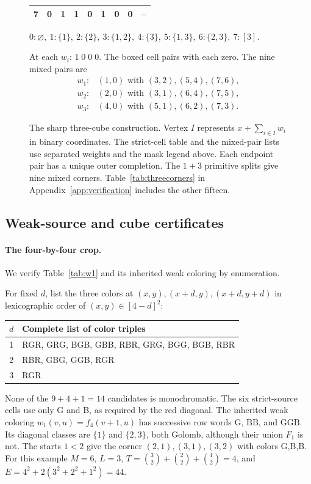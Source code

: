 \documentclass[11pt,a4paper]{article}
\theoremstyle{definition}
\numberwithin{equation}{section}
\begin{document}
\begin{figure}[htbp]
\begin{minipage}[c]{.51\textwidth}
\begin{tabular}{@{}r*{8}{r}@{}}
				7&0&1&1&0&1&0&0&--\\\bottomrule
			\end{tabular}
		\end{minipage}
		\par\medskip
		$0:\varnothing,\ 1:\{1\},\ 2:\{2\},\ 3:\{1,2\},\ 4:\{3\},\ 5:\{1,3\},\ 6:\{2,3\},\ 7:[3].$
		\par\smallskip
		At each $w_i$: $\boxed{1}\;0\;0\;0$. The boxed cell pairs with each zero. The nine mixed pairs are
		\[
		\begin{array}{ll}
			w_1:&(1,0)\text{ with }(3,2),(5,4),(7,6),\\
			w_2:&(2,0)\text{ with }(3,1),(6,4),(7,5),\\
			w_3:&(4,0)\text{ with }(5,1),(6,2),(7,3).
		\end{array}
		\]
		\caption{The sharp three-cube construction. Vertex $I$ represents $x+\sum_{i\in I}w_i$ in binary coordinates. The strict-cell table and the mixed-pair lists use separated weights and the mask legend above. Each endpoint pair has a unique outer completion. The $1+3$ primitive splits give nine mixed corners. Table~\ref{tab:threecorners} in Appendix~\ref{app:verification} includes the other fifteen.}
		\label{fig:cube}
	\end{figure}

\subsection{Weak-source and cube certificates}
\paragraph{The four-by-four crop.}\label{app:crop-check}
We verify Table~\ref{tab:w1} and its inherited weak coloring by enumeration.

For fixed $d$, list the three colors at $(x,y),(x+d,y),(x+d,y+d)$ in lexicographic order of $(x,y)\in[4-d]^2$:
\begin{center}
	\begin{tabular}{@{}cl@{}}
		\toprule $d$&Complete list of color triples\\\midrule
		1&RGR, GRG, BGB, GBB, RBR, GRG, BGG, BGB, RBR\\
		2&RBR, GBG, GGB, RGR\\
		3&RGR\\\bottomrule
	\end{tabular}
\end{center}
None of the $9+4+1=14$ candidates is monochromatic. The six strict-source cells use only G and B, as required by the red diagonal. The inherited weak coloring $w_1(v,u)=f_4(v+1,u)$ has successive row words $\mathrm G$, $\mathrm{BB}$, and $\mathrm{GGB}$. Its diagonal classes are $\{1\}$ and $\{2,3\}$, both Golomb, although their union $F_1$ is not. The starts $1<2$ give the corner $(2,1),(3,1),(3,2)$ with colors G,B,B. For this example $M=6$, $L=3$, $T=\binom32+\binom22+\binom12=4$, and $E=4^2+2(3^2+2^2+1^2)=44$. 
\end{document}

